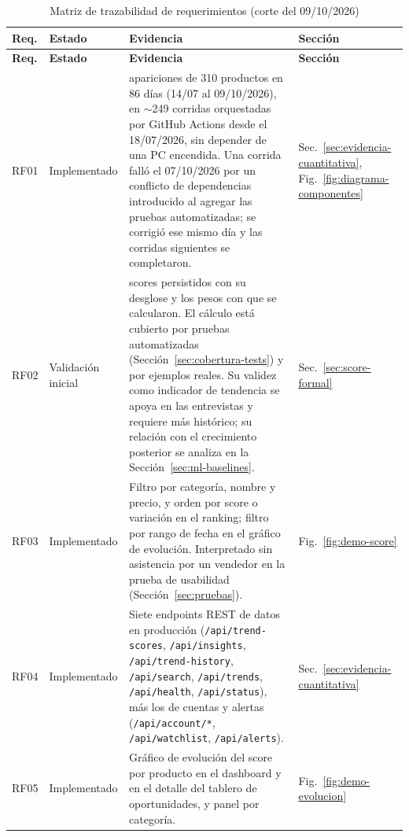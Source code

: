 \setlength{\LTcapwidth}{\textwidth}
\begin{longtable}{@{}>{\raggedright\arraybackslash}p{1.2cm} >{\raggedright\arraybackslash}p{2.3cm} >{\raggedright\arraybackslash}p{8.7cm} >{\raggedright\arraybackslash}p{1.9cm}@{}}
	\caption{Matriz de trazabilidad de requerimientos (corte del 09/10/2026)} \label{tab:trazabilidad} \\
	\toprule
	\textbf{Req.} & \textbf{Estado} & \textbf{Evidencia} & \textbf{Sección} \\
	\midrule
	\endfirsthead
	\toprule
	\textbf{Req.} & \textbf{Estado} & \textbf{Evidencia} & \textbf{Sección} \\
	\midrule
	\endhead
	RF01 & Implementado & 6819 apariciones de 310 productos en 86 días (14/07 al 09/10/2026), en $\sim$249 corridas orquestadas por GitHub Actions desde el 18/07/2026, sin depender de una PC encendida. Una corrida falló el 07/10/2026 por un conflicto de dependencias introducido al agregar las pruebas automatizadas; se corrigió ese mismo día y las corridas siguientes se completaron. & Sec.~\ref{sec:evidencia-cuantitativa}, Fig.~\ref{fig:diagrama-componentes} \\
	RF02 & Validación inicial & 13.918 scores persistidos con su desglose y los pesos con que se calcularon. El cálculo está cubierto por pruebas automatizadas (Sección~\ref{sec:cobertura-tests}) y por ejemplos reales. Su validez como indicador de tendencia se apoya en las entrevistas y requiere más histórico; su relación con el crecimiento posterior se analiza en la Sección~\ref{sec:ml-baselines}. & Sec.~\ref{sec:score-formal} \\
	RF03 & Implementado & Filtro por categoría, nombre y precio, y orden por score o variación en el ranking; filtro por rango de fecha en el gráfico de evolución. Interpretado sin asistencia por un vendedor en la prueba de usabilidad (Sección~\ref{sec:pruebas}). & Fig.~\ref{fig:demo-score} \\
	RF04 & Implementado & Siete endpoints REST de datos en producción (\texttt{/api/trend-scores}, \texttt{/api/insights}, \texttt{/api/trend-history}, \texttt{/api/search}, \texttt{/api/trends}, \texttt{/api/health}, \texttt{/api/status}), más los de cuentas y alertas (\texttt{/api/account/*}, \texttt{/api/watchlist}, \texttt{/api/alerts}). & Sec.~\ref{sec:evidencia-cuantitativa} \\
	RF05 & Implementado & Gráfico de evolución del score por producto en el dashboard y en el detalle del tablero de oportunidades, y panel por categoría. & Fig.~\ref{fig:demo-evolucion} \\

\end{longtable}
